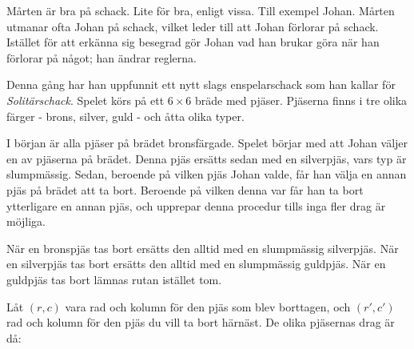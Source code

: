 
Mårten är bra på schack. Lite för bra, enligt vissa. Till exempel Johan. Mårten utmanar ofta Johan på schack,
vilket leder till att Johan förlorar på schack. Istället för att erkänna sig besegrad gör Johan vad han
brukar göra när han förlorar på något; han ändrar reglerna.

Denna gång har han uppfunnit ett nytt slags enspelarschack som han kallar för \emph{Solitärschack}. Spelet
körs på ett $6 \times 6$ bräde med pjäser. Pjäserna finns i tre olika färger - brons, silver, guld - och
åtta olika typer.

I början är alla pjäser på brädet bronsfärgade. Spelet börjar med att Johan väljer en av pjäserna på brädet.
Denna pjäs ersätts sedan med en silverpjäs, vars typ är slumpmässig. Sedan, beroende på vilken pjäs Johan
valde, får han välja en annan pjäs på brädet att ta bort. Beroende på vilken denna var får han ta bort ytterligare
en annan pjäs, och upprepar denna procedur tills inga fler drag är möjliga.

När en bronspjäs tas bort ersätts den alltid med en slumpmässig silverpjäs. När en silverpjäs tas bort
ersätts den alltid med en slumpmässig guldpjäs. När en guldpjäs tas bort lämnas rutan istället tom.

Låt $(r, c)$ vara rad och kolumn för den pjäs som blev borttagen, och $(r', c')$ rad och kolumn för den
pjäs du vill ta bort härnäst. De olika pjäsernas drag är då:

